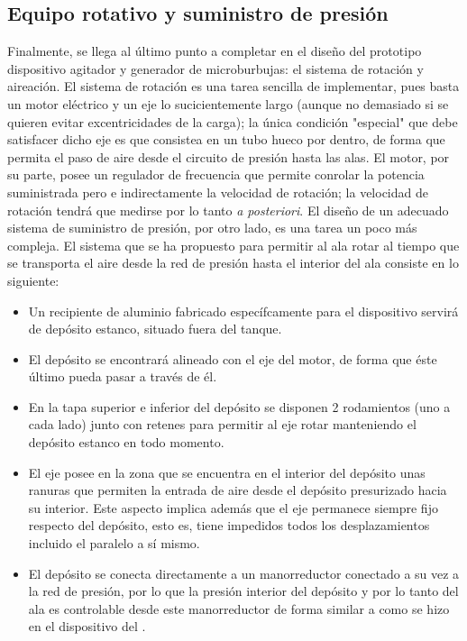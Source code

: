 \subsection{Equipo rotativo y suministro de presión}

Finalmente, se llega al último punto a completar en el diseño del prototipo dispositivo agitador y generador de microburbujas: el sistema de rotación y aireación.  El sistema de rotación es una tarea sencilla de implementar, pues basta un motor eléctrico y un eje lo sucicientemente largo (aunque no demasiado si se quieren evitar excentricidades de la carga); la única condición "especial" que debe satisfacer dicho eje es que consistea en un tubo hueco por dentro, de forma que permita el paso de aire desde el circuito de presión hasta las alas. El motor, por su parte, posee un regulador de frecuencia que permite conrolar la potencia suministrada pero e indirectamente la velocidad de rotación; la velocidad de rotación tendrá que medirse por lo tanto \textit{a posteriori}. El diseño de un adecuado sistema de suministro de presión, por otro lado, es una tarea un poco más compleja. El sistema que se ha propuesto para permitir al ala rotar al tiempo que se transporta el aire desde la red de presión hasta el interior del ala consiste en lo siguiente:

\begin{itemize}
\item Un recipiente de aluminio fabricado específcamente para el dispositivo servirá de depósito estanco, situado fuera del tanque.
\item El depósito se encontrará alineado con el eje del motor, de forma que éste último pueda pasar a través de él. 
\item En la tapa superior e inferior del depósito se disponen 2 rodamientos (uno a cada lado) junto con retenes para permitir al eje rotar manteniendo el depósito estanco en todo momento. 
\item El eje posee en la zona que se encuentra en el interior del depósito unas ranuras que permiten la entrada de aire desde el depósito presurizado hacia su interior. Este aspecto implica además que el eje permanece siempre fijo respecto del depósito, esto es, tiene impedidos todos los desplazamientos incluido el paralelo a sí mismo. 
\item El depósito se conecta directamente a un manorreductor conectado a su vez a la red de presión, por lo que la presión interior del depósito y por lo tanto del ala es controlable desde este manorreductor de forma similar a como se hizo en el dispositivo del . 
\end{itemize}

